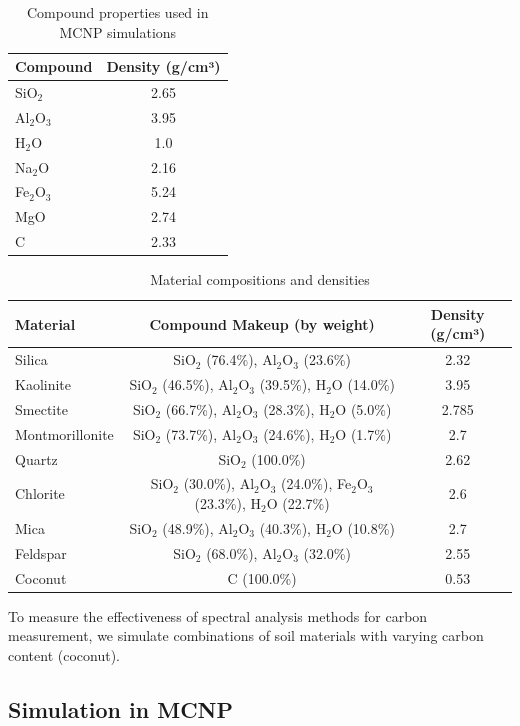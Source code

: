 \documentclass[review]{elsarticle}
\begin{document}
\begin{table}[H]
\centering
\caption{Compound properties used in MCNP simulations}
\label{tab:compounds}
\begin{tabular}{@{}lc@{}}
\toprule
Compound & Density (g/cm³) \\
\midrule
SiO$_2$ & 2.65 \\
Al$_2$O$_3$ & 3.95 \\
H$_2$O & 1.0 \\
Na$_2$O & 2.16 \\
Fe$_2$O$_3$ & 5.24 \\
MgO & 2.74 \\
C & 2.33 \\
\bottomrule
\end{tabular}
\end{table}

\begin{table}[H]
\centering
\caption{Material compositions and densities}
\label{tab:materials}
\begin{tabular}{@{}lcc@{}}
\toprule
Material & Compound Makeup (by weight) & Density (g/cm³) \\
\midrule
Silica & SiO$_2$ (76.4\%), Al$_2$O$_3$ (23.6\%) & 2.32 \\
Kaolinite & SiO$_2$ (46.5\%), Al$_2$O$_3$ (39.5\%), H$_2$O (14.0\%) & 3.95 \\
Smectite & SiO$_2$ (66.7\%), Al$_2$O$_3$ (28.3\%), H$_2$O (5.0\%) & 2.785 \\
Montmorillonite & SiO$_2$ (73.7\%), Al$_2$O$_3$ (24.6\%), H$_2$O (1.7\%) & 2.7 \\
Quartz & SiO$_2$ (100.0\%) & 2.62 \\
Chlorite & SiO$_2$ (30.0\%), Al$_2$O$_3$ (24.0\%), Fe$_2$O$_3$ (23.3\%), H$_2$O (22.7\%) & 2.6 \\
Mica & SiO$_2$ (48.9\%), Al$_2$O$_3$ (40.3\%), H$_2$O (10.8\%) & 2.7 \\
Feldspar & SiO$_2$ (68.0\%), Al$_2$O$_3$ (32.0\%) & 2.55 \\
Coconut & C (100.0\%) & 0.53 \\
\bottomrule
\end{tabular}
\end{table}

To measure the effectiveness of spectral analysis methods for carbon measurement, we simulate combinations of soil materials with varying carbon content (coconut).

\subsection{Simulation in MCNP}
\end{document}
